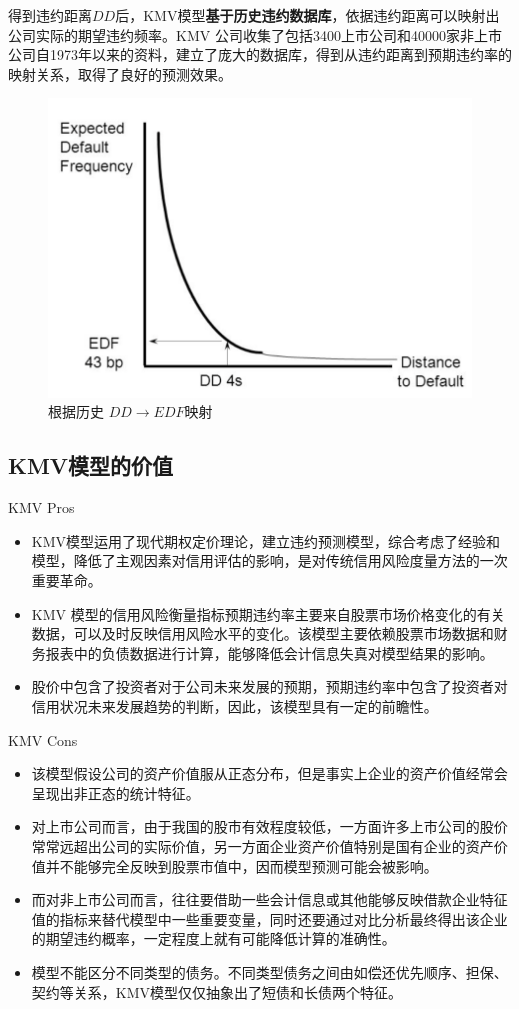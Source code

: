 \documentclass{ctexbeamer}
\begin{document}
\begin{frame}
    得到违约距离$DD$后，KMV模型\textbf{基于历史违约数据库}，依据违约距离可以映射出公司实际的期望违约频率。KMV 公司收集了包括3400上市公司和40000家非上市公司自1973年以来的资料，建立了庞大的数据库，得到从违约距离到预期违约率的映射关系，取得了良好的预测效果。
    \begin{figure}
        \includegraphics[width=0.5\linewidth]{fig/edf.png}
        \caption{根据历史 $DD\to EDF$映射}
    \end{figure}
\end{frame}
\subsection{KMV模型的价值}
\begin{frame}{KMV Pros}
    \begin{itemize}
        \item KMV模型运用了现代期权定价理论，建立违约预测模型，综合考虑了经验和模型，降低了主观因素对信用评估的影响，是对传统信用风险度量方法的一次重要革命。
        \item KMV 模型的信用风险衡量指标预期违约率主要来自股票市场价格变化的有关数据，可以及时反映信用风险水平的变化。该模型主要依赖股票市场数据和财务报表中的负债数据进行计算，能够降低会计信息失真对模型结果的影响。
        \item 股价中包含了投资者对于公司未来发展的预期，预期违约率中包含了投资者对信用状况未来发展趋势的判断，因此，该模型具有一定的前瞻性。
    \end{itemize}
\end{frame}
\begin{frame}{KMV Cons}
    \begin{itemize}
        \item 该模型假设公司的资产价值服从正态分布，但是事实上企业的资产价值经常会呈现出非正态的统计特征。
        \item 对上市公司而言，由于我国的股市有效程度较低，一方面许多上市公司的股价常常远超出公司的实际价值，另一方面企业资产价值特别是国有企业的资产价值并不能够完全反映到股票市值中，因而模型预测可能会被影响。
        \item 而对非上市公司而言，往往要借助一些会计信息或其他能够反映借款企业特征值的指标来替代模型中一些重要变量，同时还要通过对比分析最终得出该企业的期望违约概率，一定程度上就有可能降低计算的准确性。
        \item 模型不能区分不同类型的债务。不同类型债务之间由如偿还优先顺序、担保、契约等关系，KMV模型仅仅抽象出了短债和长债两个特征。
    \end{itemize}
\end{frame}
\end{document}
